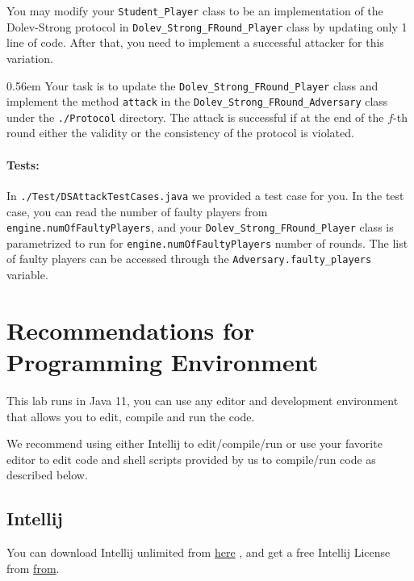 You may modify your \texttt{Student\_Player} class to be an implementation of the Dolev-Strong protocol in \texttt{Dolev\_Strong\_FRound\_Player} class by updating only 1 line of code. After that, you need to implement a successful attacker for this variation.

    {\spaceskip  0.56em  \relax Your task is to update the \texttt{Dolev\_Strong\_FRound\_Player} class and implement the method \texttt{attack} in the } \texttt{Dolev\_Strong\_FRound\_Adversary} class
under the {\tt ./Protocol} directory.
The attack is successful if at the end of the $f$-th round either the validity or the consistency of the protocol is violated.

\paragraph{Tests:}
In {\tt ./Test/DSAttackTestCases.java} we provided a test case for you. 
In the test case, you can read the number of faulty players
from {\tt engine.numOfFaultyPlayers},
and your
\texttt{Dolev\_Strong\_FRound\_Player} class is parametrized to run for
    {\tt engine.numOfFaultyPlayers}  number of rounds.
The list of
faulty players can be accessed through the
    {\tt Adversary.faulty\_players} variable.



\section{Recommendations for Programming Environment}
\label{sec:reco}

This lab runs in Java 11,
you can use any editor and development environment that allows you to edit, compile and run the code.
\bigskip

We recommend using either Intellij to edit/compile/run or use your favorite editor to edit code and shell scripts provided by us to compile/run code as described below.

\subsection{Intellij}
You can download Intellij unlimited from
\href{https://www.jetbrains.com/idea/download/}{here}
, and get a free Intellij License from
\href{https://www.jetbrains.com/shop/eform/students}{from}.
\bigskip

